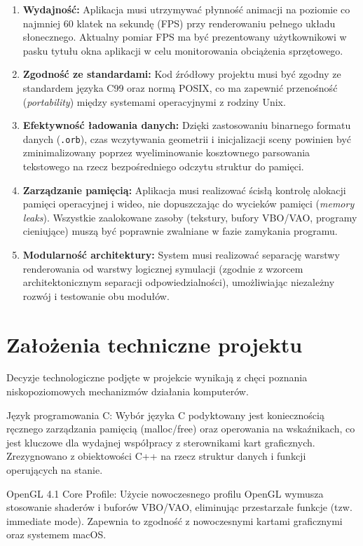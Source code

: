     \begin{enumerate}
        \item \textbf{Wydajność:} Aplikacja musi utrzymywać płynność animacji na poziomie co najmniej 60 klatek na sekundę (FPS) przy renderowaniu pełnego układu słonecznego. Aktualny pomiar FPS ma być prezentowany użytkownikowi w pasku tytułu okna aplikacji w celu monitorowania obciążenia sprzętowego.
        \item \textbf{Zgodność ze standardami:} Kod źródłowy projektu musi być zgodny ze standardem języka C99 oraz normą POSIX, co ma zapewnić przenośność (\textit{portability}) między systemami operacyjnymi z rodziny Unix.
        \item \textbf{Efektywność ładowania danych:} Dzięki zastosowaniu binarnego formatu danych (\texttt{.orb}), czas wczytywania geometrii i inicjalizacji sceny powinien być zminimalizowany poprzez wyeliminowanie kosztownego parsowania tekstowego na rzecz bezpośredniego odczytu struktur do pamięci.
        \item \textbf{Zarządzanie pamięcią:} Aplikacja musi realizować ścisłą kontrolę alokacji pamięci operacyjnej i wideo, nie dopuszczając do wycieków pamięci (\textit{memory leaks}). Wszystkie zaalokowane zasoby (tekstury, bufory VBO/VAO, programy cieniujące) muszą być poprawnie zwalniane w fazie zamykania programu.
        \item \textbf{Modularność architektury:} System musi realizować separację warstwy renderowania od warstwy logicznej symulacji (zgodnie z wzorcem architektonicznym separacji odpowiedzialności), umożliwiając niezależny rozwój i testowanie obu modułów.
    \end{enumerate}

    \section{Założenia techniczne projektu}

     Decyzje technologiczne podjęte w projekcie wynikają z chęci poznania niskopoziomowych mechanizmów działania komputerów.


     Język programowania C: Wybór języka C podyktowany jest koniecznością ręcznego zarządzania pamięcią (malloc/free) oraz operowania na wskaźnikach, co jest kluczowe dla wydajnej współpracy z sterownikami kart graficznych. Zrezygnowano z obiektowości C++ na rzecz struktur danych i funkcji operujących na stanie.


     OpenGL 4.1 Core Profile: Użycie nowoczesnego profilu OpenGL wymusza stosowanie shaderów i buforów VBO/VAO, eliminując przestarzałe funkcje (tzw. immediate mode). Zapewnia to zgodność z nowoczesnymi kartami graficznymi oraz systemem macOS.


